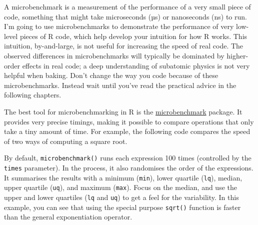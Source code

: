 A microbenchmark is a measurement of the performance of a very small
piece of code, something that might take microseconds (µs) or
nanoseconds (ns) to run. I'm going to use microbenchmarks to demonstrate
the performance of very low-level pieces of R code, which help develop
your intuition for how R works. This intuition, by-and-large, is not
useful for increasing the speed of real code. The observed differences
in microbenchmarks will typically be dominated by higher-order effects
in real code; a deep understanding of subatomic physics is not very
helpful when baking. Don't change the way you code because of these
microbenchmarks. Instead wait until you've read the practical advice in
the following chapters. 

The best tool for microbenchmarking in R is the
\href{http://cran.r-project.org/web/packages/microbenchmark/}{microbenchmark}
package. It provides very precise timings, making it possible to compare
operations that only take a tiny amount of time. For example, the
following code compares the speed of two ways of computing a square
root.

\begin{Shaded}
\begin{Highlighting}[]

\StringTok{ }\NormalTok{(}\NormalTok{)}
\NormalTok{(}
  \StringTok{ }
\NormalTok{)}
\end{Highlighting}
\end{Shaded}

By default, \texttt{microbenchmark()} runs each expression 100 times
(controlled by the \texttt{times} parameter). In the process, it also
randomises the order of the expressions. It summarises the results with
a minimum (\texttt{min}), lower quartile (\texttt{lq}), median, upper
quartile (\texttt{uq}), and maximum (\texttt{max}). Focus on the median,
and use the upper and lower quartiles (\texttt{lq} and \texttt{uq}) to
get a feel for the variability. In this example, you can see that using
the special purpose \texttt{sqrt()} function is faster than the general
exponentiation operator.


